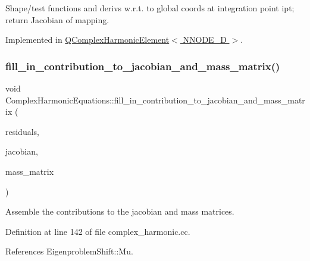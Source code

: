 Shape/test functions and derivs w.\+r.\+t. to global coords at integration point ipt; return Jacobian of mapping. 



Implemented in \hyperlink{classQComplexHarmonicElement_a3f8d1d9396135d4d86f416dcf6c23904}{Q\+Complex\+Harmonic\+Element$<$ N\+N\+O\+D\+E\+\_\+D $>$}.

\mbox{\label{classComplexHarmonicEquations_a4c67a0c220f61d6c300703f29c00b1ef}} 
\subsubsection{\texorpdfstring{fill\+\_\+in\+\_\+contribution\+\_\+to\+\_\+jacobian\+\_\+and\+\_\+mass\+\_\+matrix()}{fill\_in\_contribution\_to\_jacobian\_and\_mass\_matrix()}}
{\footnotesize\ttfamily void Complex\+Harmonic\+Equations\+::fill\+\_\+in\+\_\+contribution\+\_\+to\+\_\+jacobian\+\_\+and\+\_\+mass\+\_\+matrix (\begin{DoxyParamCaption}\item[{Vector$<$ double $>$ \&}]{residuals,  }\item[{Dense\+Matrix$<$ double $>$ \&}]{jacobian,  }\item[{Dense\+Matrix$<$ double $>$ \&}]{mass\+\_\+matrix }\end{DoxyParamCaption})\hspace{0.3cm}{\ttfamily [inline]}}



Assemble the contributions to the jacobian and mass matrices. 



Definition at line 142 of file complex\+\_\+harmonic.\+cc.



References Eigenproblem\+Shift\+::\+Mu.

\mbox{\label{classComplexHarmonicEquations_a9e8774f4cf492bd267c0a170bf4f81a6}} 
